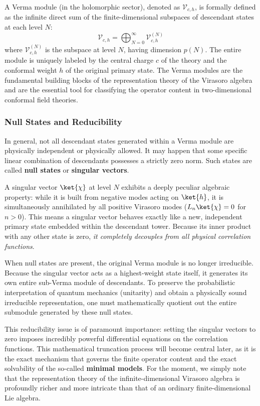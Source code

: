 A Verma module (in the holomorphic sector), denoted as \(\mathcal{V}_{c,h}\), is formally defined as the infinite direct sum of the finite-dimensional subspaces of descendant states at each level \(N\):
\[
    \mathcal{V}_{c,h} = \bigoplus_{N=0}^{\infty} \mathcal{V}_{c,h}^{(N)}
\]
where \(\mathcal{V}_{c,h}^{(N)}\) is the subspace at level \(N\), having dimension \(p(N)\). The entire module is uniquely labeled by the central charge \(c\) of the theory and the conformal weight \(h\) of the original primary state. The Verma modules are the fundamental building blocks of the representation theory of the Virasoro algebra and are the essential tool for classifying the operator content in two-dimensional conformal field theories.

\subsubsection{Null States and Reducibility}

In general, not all descendant states generated within a Verma module are physically independent or physically allowed. It may happen that some specific linear combination of descendants possesses a strictly zero norm. Such states are called \textbf{null states} or \textbf{singular vectors}.

A singular vector \(\ket{\chi}\) at level \(N\) exhibits a deeply peculiar algebraic property: while it is built from negative modes acting on \(\ket{h}\), it is simultaneously annihilated by all positive Virasoro modes (\(L_n \ket{\chi} = 0\) for \(n > 0\)). This means a singular vector behaves exactly like a new, independent primary state embedded within the descendant tower. Because its inner product with any other state is zero, \textit{it completely decouples from all physical correlation functions}.

When null states are present, the original Verma module is no longer irreducible. Because the singular vector acts as a highest-weight state itself, it generates its own entire sub-Verma module of descendants. To preserve the probabilistic interpretation of quantum mechanics (unitarity) and obtain a physically sound irreducible representation, one must mathematically quotient out the entire submodule generated by these null states.

This reducibility issue is of paramount importance: setting the singular vectors to zero imposes incredibly powerful differential equations on the correlation functions. This mathematical truncation process will become central later, as it is the exact mechanism that governs the finite operator content and the exact solvability of the so-called \textbf{minimal models}. For the moment, we simply note that the representation theory of the infinite-dimensional Virasoro algebra is profoundly richer and more intricate than that of an ordinary finite-dimensional Lie algebra.